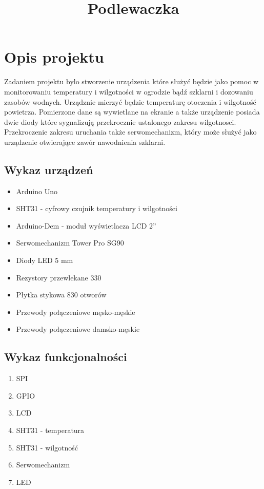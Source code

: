 \documentclass{classrep}
\author{
  \studentinfo{KONRAD PŁAWIK}{191458} \and
  \studentinfo{Vladislav Mazur}{199185} \and
  \studentinfo{Łukasz Połubiński}{211833}
}
\title{Podlewaczka}
\begin{document}
\maketitle
\newpage
\tableofcontents
\newpage

\section {Opis projektu}
Zadaniem projektu bylo stworzenie urządzenia które służyć będzie jako pomoc w monitorowaniu temperatury i wilgotności w ogrodzie bądź szklarni i dozowaniu zasobów wodnych. Urządznie mierzyć będzie temperaturę otoczenia i wilgotność powietrza. Pomierzone dane są wywietlane na ekranie a także urządzenie posiada dwie diody które sygnalizują przekrocznie ustalonego zakresu wilgotnosci. Przekroczenie zakresu uruchania także serwomechanizm, który może służyć jako urządzenie otwierające zawór nawodnienia szklarni.\\

\subsection {Wykaz urządzeń}
\begin{itemize} 
  \item Arduino Uno
  \item SHT31 - cyfrowy czujnik temperatury i wilgotności
  \item Arduino-Dem - moduł wyświetlacza LCD 2''
  \item Serwomechanizm Tower Pro SG90
  \item Diody LED 5 mm
  \item Rezystory przewlekane 330 \ohm
  \item Płytka stykowa 830 otworów
  \item Przewody połączeniowe męsko-męskie
  \item Przewody połączeniowe damsko-męskie
\end{itemize}

\subsection {Wykaz funkcjonalności}
\begin{enumerate}
  \item SPI
  \item GPIO
  \item LCD
  \item SHT31 - temperatura
  \item SHT31 - wilgotność
  \item Serwomechanizm
  \item LED
\end{enumerate}
\end{document}
